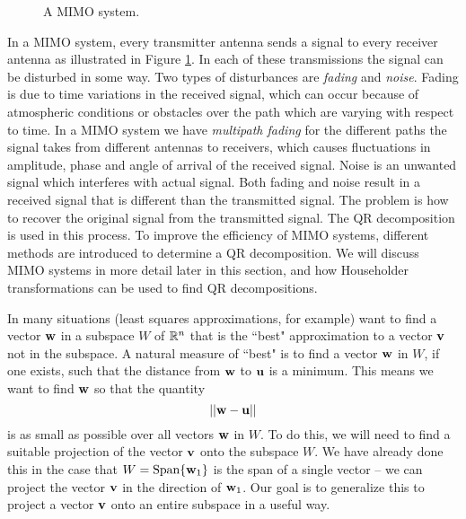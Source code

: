 \begin{figure}[ht]
\begin{center}
\caption{A MIMO system.}
\label{F:MIMO}
\end{center}
\end{figure}
In a MIMO system, every transmitter antenna sends a signal to every receiver antenna as illustrated in Figure \ref{F:MIMO}. In each of these transmissions the signal can be disturbed in some way. Two types of disturbances are \emph{fading} and \emph{noise}. Fading is due to time variations in the received signal, which can occur because of atmospheric conditions or obstacles over the path which are varying with respect to time. In a MIMO system we have \emph{multipath fading} for the different paths the signal takes from different antennas to receivers, which causes fluctuations in amplitude, phase and angle of arrival of the received signal. Noise is an unwanted signal which interferes with actual signal. Both fading and noise result in a received signal that is different than the transmitted signal. The problem is how to recover the original signal from the transmitted signal. The QR decomposition is used in this process. To improve the efficiency of MIMO systems, different methods are introduced to determine a QR decomposition. We will discuss MIMO systems in more detail later in this section, and how Householder transformations can be used to find QR decompositions. 


In many situations (least squares approximations, for example) want to find a vector $\mathbf{w}$ in a subspace $W$ of $\mathbb{R}^n$ that is the ``best" approximation to a vector $\mathbf{v}$ not in the subspace. A natural measure of ``best" is to find a vector $\mathbf{w}$ in $W$, if one exists, such that the distance from $\mathbf{w}$ to $\mathbf{u}$ is a minimum. This means we want to find $\mathbf{w}$ so that the quantity
\[||\mathbf{w} - \mathbf{u} ||\]
is as small as possible over all vectors $\mathbf{w}$ in $W$. To do this, we will need to find a suitable projection of the vector $\mathbf{v}$ onto the subspace $W$. We have already done this in the case that $W = \text{Span}\{\mathbf{w}_1\}$  is the span of a single vector -- we can project the vector $\mathbf{v}$ in the direction of $\mathbf{w}_1$. Our goal is to generalize this to project a vector $\mathbf{v}$ onto an entire subspace in a useful way. 

